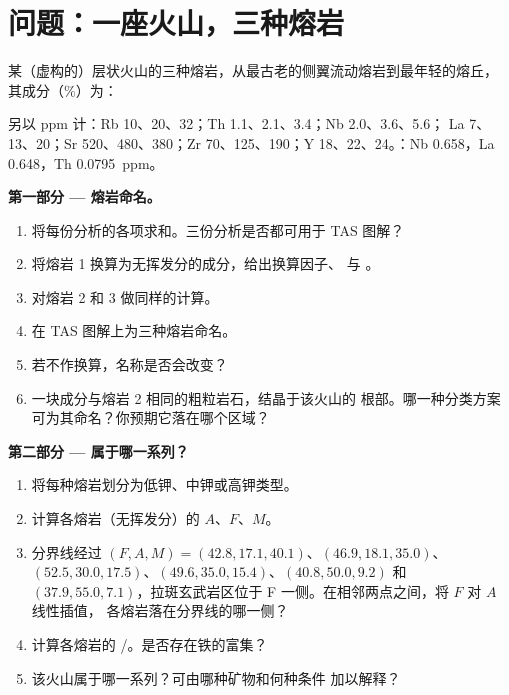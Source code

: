 \section{问题：一座火山，三种熔岩}

\begin{problem}
\label{pb:b2:magmatic-series:1}
某（虚构的）层状火山的三种熔岩，从最古老的侧翼流动熔岩到最年轻的熔丘，
其成分（\unit{\percent}）为：

\smallskip{}

\smallskip\noindent 另以 ppm 计：Rb 10、20、32；Th 1.1、2.1、3.4；Nb 2.0、3.6、5.6；
La 7、13、20；Sr 520、480、380；Zr 70、125、190；Y 18、22、24。：Nb
0.658，La 0.648，Th \qty{0.0795}{ppm}。

\noindent\textbf{第一部分 --- 熔岩命名。}
\begin{enumerate}
\item 将每份分析的各项求和。三份分析是否都可用于 TAS 图解？
\item 将熔岩 1 换算为无挥发分的成分，给出换算因子、 与
。
\item 对熔岩 2 和 3 做同样的计算。
\item 在 TAS 图解上为三种熔岩命名。
\item 若不作换算，名称是否会改变？
\item 一块成分与熔岩 2 相同的粗粒岩石，结晶于该火山的
根部。哪一种分类方案可为其命名？你预期它落在哪个区域？
\end{enumerate}

\noindent\textbf{第二部分 --- 属于哪一系列？}
\begin{enumerate}[resume]
\item 将每种熔岩划分为低钾、中钾或高钾类型。
\item 计算各熔岩（无挥发分）的 $A$、$F$、$M$。
\item 分界线经过 $(F, A, M) = (42.8, 17.1, 40.1)$、$(46.9, 18.1,
35.0)$、$(52.5, 30.0, 17.5)$、$(49.6, 35.0, 15.4)$、$(40.8, 50.0, 9.2)$ 和 $(37.9,
55.0, 7.1)$，拉斑玄武岩区位于 F 一侧。在相邻两点之间，将 $F$ 对 $A$ 线性插值，
各熔岩落在分界线的哪一侧？
\item 计算各熔岩的 /。是否存在铁的富集？
\item 该火山属于哪一系列？可由哪种矿物和何种条件
加以解释？
\end{enumerate}


\end{problem}
